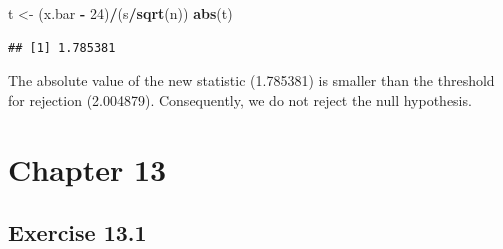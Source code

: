 \documentclass[
]{krantz}
\makeatletter
\newenvironment{Shaded}{\begin{snugshade}}{\end{snugshade}}
\newcommand{\DecValTok}[1]{\textcolor[rgb]{0.00,0.00,0.81}{#1}}
\newcommand{\KeywordTok}[1]{\textcolor[rgb]{0.13,0.29,0.53}{\textbf{#1}}}
\newcommand{\NormalTok}[1]{#1}
\newcommand{\OperatorTok}[1]{\textcolor[rgb]{0.81,0.36,0.00}{\textbf{#1}}}
\newcommand{\StringTok}[1]{\textcolor[rgb]{0.31,0.60,0.02}{#1}}
\newenvironment{kframe}{%
\medskip{}
\setlength{\fboxsep}{.8em}
 \def\at@end@of@kframe{}%
 \ifinner\ifhmode%
  \def\at@end@of@kframe{\end{minipage}}%
  \begin{minipage}{\columnwidth}%
 \fi\fi%
 \def\FrameCommand##1{\hskip\@totalleftmargin \hskip-\fboxsep
 \colorbox{shadecolor}{##1}\hskip-\fboxsep
     \hskip-\linewidth \hskip-\@totalleftmargin \hskip\columnwidth}%
 \MakeFramed {\advance\hsize-\width
   \@totalleftmargin\z@ \linewidth\hsize
   \@setminipage}}%
 {\par\unskip\endMakeFramed%
 \at@end@of@kframe}
\renewenvironment{Shaded}{\begin{kframe}}{\end{kframe}}
\theoremstyle{definition}
\theoremstyle{definition}
\theoremstyle{definition}
\theoremstyle{remark}
\makeatother
\begin{document}
\begin{enumerate}
\begin{Shaded}
\begin{Highlighting}[]
\NormalTok{t <-}\StringTok{ }\NormalTok{(x.bar }\OperatorTok{-}\StringTok{ }\DecValTok{24}\NormalTok{)}\OperatorTok{/}\NormalTok{(s}\OperatorTok{/}\KeywordTok{sqrt}\NormalTok{(n))}
\KeywordTok{abs}\NormalTok{(t)}
\end{Highlighting}
\end{Shaded}

\begin{verbatim}
## [1] 1.785381
\end{verbatim}

  The absolute value of the new statistic (1.785381) is smaller than the
  threshold for rejection (2.004879). Consequently, we do not reject the
  null hypothesis.
\end{enumerate}

\hypertarget{chapter-13}{%
\section*{Chapter 13}\label{chapter-13}}


\hypertarget{exercise-13.1}{%
\subsection*{Exercise 13.1}\label{exercise-13.1}}
\end{document}
